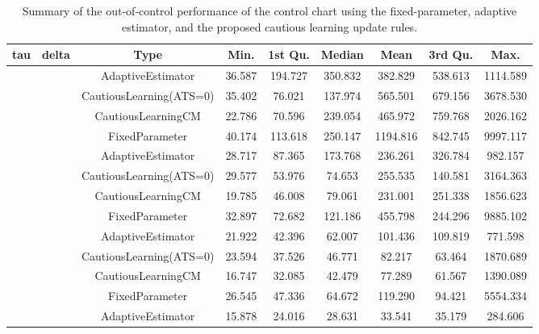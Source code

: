 \begin{table}[!h]

\caption{Summary of the out-of-control performance of the control chart using the fixed-parameter, adaptive estimator, and the proposed cautious learning update rules.}
\centering
\begin{tabular}[t]{ccccccccc}
\toprule
tau & delta & Type & Min. & 1st Qu. & Median & Mean & 3rd Qu. & Max.\\
\midrule
 &  & AdaptiveEstimator & 36.587 & 194.727 & 350.832 & 382.829 & 538.613 & 1114.589\\

 &  & CautiousLearning(ATS=0) & 35.402 & 76.021 & 137.974 & 565.501 & 679.156 & 3678.530\\

 &  & CautiousLearningCM & 22.786 & 70.596 & 239.054 & 465.972 & 759.768 & 2026.162\\

 & \multirow[t]{-4}{*}{\centering\arraybackslash 0.25} & FixedParameter & 40.174 & 113.618 & 250.147 & 1194.816 & 842.745 & 9997.117\\
\cmidrule{2-9}
 &  & AdaptiveEstimator & 28.717 & 87.365 & 173.768 & 236.261 & 326.784 & 982.157\\

 &  & CautiousLearning(ATS=0) & 29.577 & 53.976 & 74.653 & 255.535 & 140.581 & 3164.363\\

 &  & CautiousLearningCM & 19.785 & 46.008 & 79.061 & 231.001 & 251.338 & 1856.623\\

 & \multirow[t]{-4}{*}{\centering\arraybackslash 0.35} & FixedParameter & 32.897 & 72.682 & 121.186 & 455.798 & 244.296 & 9885.102\\
\cmidrule{2-9}
 &  & AdaptiveEstimator & 21.922 & 42.396 & 62.007 & 101.436 & 109.819 & 771.598\\

 &  & CautiousLearning(ATS=0) & 23.594 & 37.526 & 46.771 & 82.217 & 63.464 & 1870.689\\

 &  & CautiousLearningCM & 16.747 & 32.085 & 42.479 & 77.289 & 61.567 & 1390.089\\

 & \multirow[t]{-4}{*}{\centering\arraybackslash 0.50} & FixedParameter & 26.545 & 47.336 & 64.672 & 119.290 & 94.421 & 5554.334\\
\cmidrule{2-9}
 &  & AdaptiveEstimator & 15.878 & 24.016 & 28.631 & 33.541 & 35.179 & 284.606\\


\end{tabular}
\end{table}

